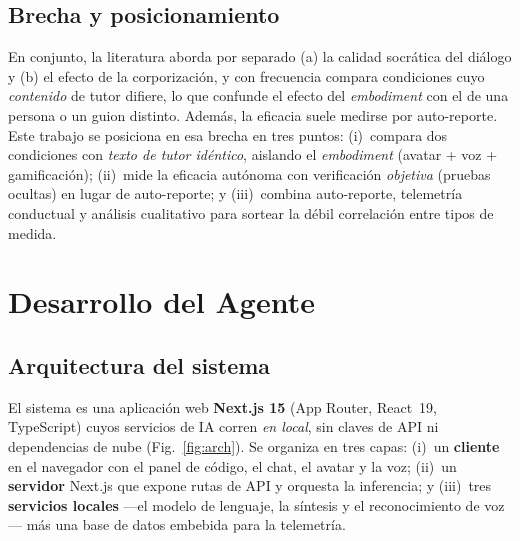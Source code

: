 \documentclass[conference]{IEEEtran}
\begin{document}
\subsection{Brecha y posicionamiento}
En conjunto, la literatura aborda por separado (a) la calidad socr\'atica del di\'alogo y (b) el
efecto de la corporizaci\'on, y con frecuencia compara condiciones cuyo \emph{contenido} de tutor
difiere, lo que confunde el efecto del \emph{embodiment} con el de una persona o un guion distinto.
Adem\'as, la eficacia suele medirse por auto-reporte. Este trabajo se posiciona en esa brecha en
tres puntos: (i)~compara dos condiciones con \emph{texto de tutor id\'entico}, aislando el
\emph{embodiment} (avatar + voz + gamificaci\'on); (ii)~mide la eficacia aut\'onoma con
verificaci\'on \emph{objetiva} (pruebas ocultas) en lugar de auto-reporte; y (iii)~combina
auto-reporte, telemetr\'ia conductual y an\'alisis cualitativo para sortear la d\'ebil correlaci\'on
entre tipos de medida.

\section{Desarrollo del Agente}
\label{sec:agent}

\subsection{Arquitectura del sistema}
El sistema es una aplicaci\'on web \textbf{Next.js 15} (App Router, React~19, TypeScript) cuyos
servicios de IA corren \emph{en local}, sin claves de API ni dependencias de nube
(Fig.~\ref{fig:arch}). Se organiza en tres capas: (i)~un \textbf{cliente} en el navegador con el
panel de c\'odigo, el chat, el avatar y la voz; (ii)~un \textbf{servidor} Next.js que expone rutas
de API y orquesta la inferencia; y (iii)~tres \textbf{servicios locales} ---el modelo de lenguaje,
la s\'intesis y el reconocimiento de voz--- m\'as una base de datos embebida para la telemetr\'ia.
\end{document}
